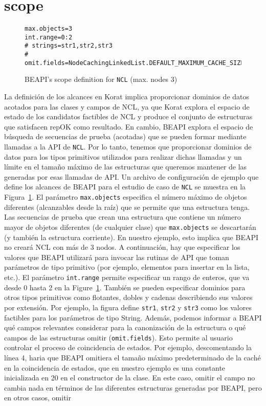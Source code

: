 \section{scope}

\begin{figure}[t!]
\begin{lstlisting}[keywordstyle=\scriptsize\ttfamily]
max.objects=3
int.range=0:2
# strings=str1,str2,str3
# omit.fields=NodeCachingLinkedList.DEFAULT_MAXIMUM_CACHE_SIZE
\end{lstlisting}
\caption{\textsf{BEAPI}'s scope definition for \texttt{NCL} (max. nodes 3)}
\label{fig:NCL-fin-BEAPI}
\end{figure}

La definición de los alcances en \textsf{Korat} implica proporcionar dominios de datos acotados para las clases y campos de NCL, ya que \textsf{Korat} explora el espacio de estado de los candidatos factibles de NCL y produce el conjunto de estructuras que satisfacen repOK como resultado. En cambio, \textsf{BEAPI} explora el espacio de búsqueda de secuencias de prueba (acotadas) que se pueden formar mediante llamadas a la API de \texttt{NCL}. Por lo tanto, tenemos que proporcionar dominios de datos para los tipos primitivos utilizados para realizar dichas llamadas y un límite en el tamaño máximo de las estructuras que queremos mantener de las generadas por esas llamadas de API. Un archivo de configuración de ejemplo que define los alcances de \textsf{BEAPI} para el estudio de caso de \texttt{NCL} se muestra en la Figura~\ref{fig:NCL-fin-BEAPI}. El parámetro \texttt{max.objects} especifica el número máximo de objetos diferentes (alcanzables desde la raíz) que se permite que una estructura tenga. Las secuencias de prueba que crean una estructura que contiene un número mayor de objetos diferentes (de cualquier clase) que \texttt{max.objects} se descartarán (y también la estructura corriente). En nuestro ejemplo, esto implica que \textsf{BEAPI} no creará NCL con más de 3 nodos. A continuación, hay que especificar los valores que \textsf{BEAPI} utilizará para invocar las rutinas de API que toman parámetros de tipo primitivo (por ejemplo, elementos para insertar en la lista, etc.). El parámetro \texttt{int.range} permite especificar un rango de enteros, que va desde 0 hasta 2 en la Figure~\ref{fig:NCL-fin-BEAPI}. También se pueden especificar dominios para otros tipos primitivos como flotantes, dobles y cadenas describiendo sus valores por extensión. Por ejemplo, la figura define \texttt{str1}, \texttt{str2} y \texttt{str3} como los valores factibles para los parámetros de tipo String. Además, podemos informar a \textsf{BEAPI} qué campos relevantes considerar para la canonización de la estructura o qué campos de las estructuras omitir (\texttt{omit.fields}). Esto permite al usuario controlar el proceso de coincidencia de estados. Por ejemplo, descomentando la línea 4, haria que \textsf{BEAPI} omitiera el tamaño máximo predeterminado de la caché en la coincidencia de estados, que en nuestro ejemplo es una constante inicializada en 20 en el constructor de la clase. En este caso, omitir el campo no cambia nada en términos de las diferentes estructuras generadas por \textsf{BEAPI}, pero en otros casos, omitir 